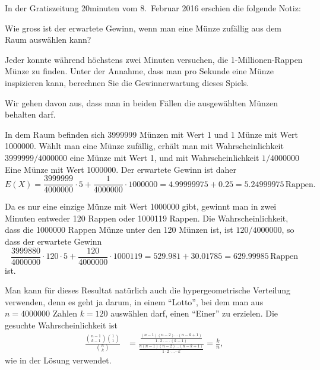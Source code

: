 In der Gratiszeitung 20minuten vom 8.~Februar 2016 erschien die folgende
Notiz:
\begin{center}
\end{center}
\begin{teilaufgaben}
\item Wie gross ist der erwartete Gewinn, wenn man eine Münze zufällig
aus dem Raum auswählen kann?
\item
Jeder konnte während höchstens zwei Minuten versuchen, die 1-Millionen-Rappen
Münze zu finden. 
Unter der Annahme, dass man pro Sekunde eine Münze inspizieren kann, 
berechnen Sie die Gewinnerwartung dieses Spiels.
\end{teilaufgaben}
Wir gehen davon aus, dass man in beiden Fällen die ausgewählten Münzen
behalten darf.


\begin{loesung}
\begin{teilaufgaben}
\item
In dem Raum befinden sich 3999999 Münzen mit Wert 1 und 1 Münze mit
Wert 1000000.
Wählt man eine Münze zufällig, erhält man mit Wahrscheinlichkeit
$3999999/4000000$ eine Münze mit Wert 1, und mit Wahrscheinlichkeit
$1/4000000$ Eine Münze mit Wert 1000000.
Der erwartete Gewinn ist daher
\[
E(X) = \frac{3999999}{4000000}\cdot 5 + \frac{1}{4000000}\cdot 1000000
=4.99999975 + 0.25 = 5.24999975\,\text{Rappen}.
\]
\item
Da es nur eine einzige Münze mit Wert 1000000 gibt, gewinnt man
in zwei Minuten entweder 120 Rappen oder 1000119 Rappen.
Die Wahrscheinlichkeit, dass die 1000000 Rappen Münze unter den
120 Münzen ist, ist $120/4000000$, so dass der erwartete Gewinn
\[
\frac{3999880}{4000000}\cdot 120\cdot 5
+
\frac{120}{4000000}\cdot 1000119
=
529.981 + 30.01785=629.99985\,\text{Rappen}
\]
ist.
\end{teilaufgaben}
\end{loesung}

\begin{diskussion}
Man kann für dieses Resultat natürlich auch die hypergeometrische
Verteilung verwenden, denn es geht ja darum, in einem ``Lotto'', bei dem
man aus $n=4000000$ Zahlen $k=120$ auswählen darf, einen ``Einer''
zu erzielen.
Die gesuchte Wahrscheinlichkeit ist
\begin{align*}
\frac{\displaystyle\binom{n-1}{k-1}\binom{1}{1}}{\displaystyle\binom{n}{k}}
&=
\frac{\displaystyle\frac{(n-1)(n-2)\dots(n-k+1)}{1\cdot 2\cdot\dots\cdot (k-1)}}%
{\displaystyle\frac{n(n-1)(n-2)\dots(n-k+1)}{1\cdot 2\cdot\dots\cdots k}}
=\frac{k}{n},
\end{align*}
wie in der Lösung verwendet.
\end{diskussion}

